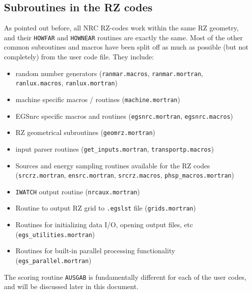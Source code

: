 \documentclass[12pt,twoside]{article}  %
\begin{document}
\subsection{Subroutines in the RZ codes}

As pointed out before, all NRC RZ-codes work within the same RZ
geometry, and their \verb+HOWFAR+ and \verb+HOWNEAR+ routines are
exactly the same. Most of the other common subroutines and macros
have been split off as much as possible (but not completely)
from the user code file. They include:

\begin{itemize}
\item{random number generators (\verb+ranmar.macros+,
\verb+ranmar.mortran+,\\
\verb+ranlux.macros+, \verb+ranlux.mortran+)}

\item{machine specific macros / routines
(\verb+machine.mortran+)}

\item{EGSnrc specific macros and routines
(\verb+egsnrc.mortran+, \verb+egsnrc.macros+)}

\item{RZ geometrical subroutines
(\verb+geomrz.mortran+)}

\item{input parser routines
(\verb+get_inputs.mortran+, {\tt transportp.macros})}

\item{Sources and energy sampling routines available for the RZ codes
(\verb+srcrz.mortran+, \verb+ensrc.mortran+, {\tt srcrz.macros},
{\tt phsp\_macros.mortran})}

\item{{\tt IWATCH} output routine
(\verb+nrcaux.mortran+)}

\item{Routine to output RZ grid to {\tt .egslst} file ({\tt grids.mortran})}

\item{Routines for initializing data I/O, opening output files, etc
({\tt egs\_utilities.mortran})}

\item{Routines for built-in parallel processing functionality
({\tt egs\_parallel.mortran})}

\end{itemize}
The scoring routine \verb+AUSGAB+ is fundamentally different for each
of the user codes, and will be discussed later in this document.
\end{document}
